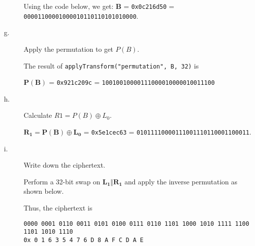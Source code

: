 \documentclass[../hw_sols.tex]{subfiles}
\begin{document}
\begin{description}
\begin{solution}
Using the code below, we get: 
$\mathbf{B}$ = \verb|0x0c216d50| = \verb|00001100001000010110110101010000|.



\end{solution}


\item[g.] Apply the permutation to get $P(B)$.

\begin{solution}
The result of \verb|applyTransform("permutation", B, 32)| is
\begin{center}
	$\mathbf{P(B)}$ 
	= \verb|0x921c209c|
	= \verb|10010010000111000010000010011100|
\end{center}
\end{solution}


\item[h.] Calculate $R1 = P(B) \oplus L_0$.

\begin{solution}
$\mathbf{R_1} 
= \mathbf{P(B)} \oplus \mathbf{L_0}$
= \verb|0x5e1cec63|
= \verb|01011110000111001110110001100011|.
\end{solution}


\newpage


\item[i.] Write down the ciphertext.

\begin{solution}

Perform a 32-bit swap on $\mathbf{L_1 \Vert R_1}$ and apply the inverse 
permutation as shown below.



Thus, the ciphertext is
\begin{center}
	\verb|0000 0001 0110 0011 0101 0100 0111 0110 1101 1000 1010 1111 1100 1101 1010 1110| \\
	\verb|0x 0 1 6 3 5 4 7 6 D 8 A F C D A E|
\end{center}

\end{solution}

\end{description}
\end{document}
